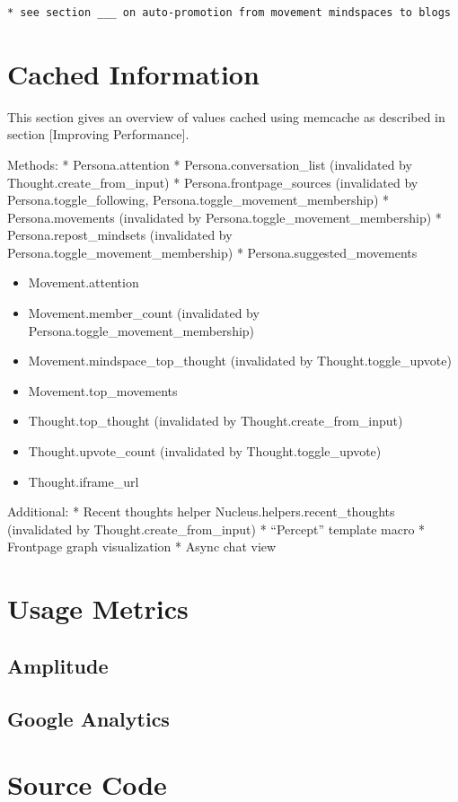 \begin{verbatim}
* see section ___ on auto-promotion from movement mindspaces to blogs
\end{verbatim}

\section{Cached Information}\label{cached-information}

This section gives an overview of values cached using memcache as
described in section {[}Improving Performance{]}.

Methods: * Persona.attention * Persona.conversation\_list (invalidated
by Thought.create\_from\_input) * Persona.frontpage\_sources
(invalidated by Persona.toggle\_following,
Persona.toggle\_movement\_membership) * Persona.movements (invalidated
by Persona.toggle\_movement\_membership) * Persona.repost\_mindsets
(invalidated by Persona.toggle\_movement\_membership) *
Persona.suggested\_movements

\begin{itemize}
\item
  Movement.attention
\item
  Movement.member\_count (invalidated by
  Persona.toggle\_movement\_membership)
\item
  Movement.mindspace\_top\_thought (invalidated by
  Thought.toggle\_upvote)
\item
  Movement.top\_movements
\item
  Thought.top\_thought (invalidated by Thought.create\_from\_input)
\item
  Thought.upvote\_count (invalidated by Thought.toggle\_upvote)
\item
  Thought.iframe\_url
\end{itemize}

Additional: * Recent thoughts helper Nucleus.helpers.recent\_thoughts
(invalidated by Thought.create\_from\_input) * ``Percept'' template
macro * Frontpage graph visualization * Async chat view

\section{Usage Metrics}\label{usage-metrics}

\subsection{Amplitude}\label{amplitude}

\subsection{Google Analytics}\label{google-analytics}

\section{Source Code}\label{source-code}



